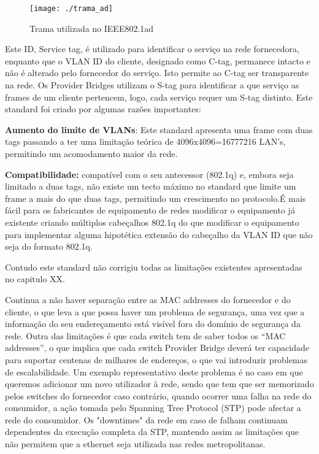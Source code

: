 \documentclass[a4paper]{IEEEtran}
\begin{document}
\begin{figure}[htp]
	\centering
	\texttt{[image: ./trama\_ad]}
	\caption{Trama utilizada no IEEE802.1ad}
	\label{fig:trama_ad}
\end{figure}

Este ID, Service tag, é utilizado para identificar o serviço na rede fornecedora, enquanto que o VLAN ID do cliente, designado como C-tag, permanece intacto e não é alterado pelo fornecedor do serviço. 
Isto permite ao C-tag ser transparente na rede. Os Provider Bridges utilizam o S-tag para identificar a que serviço as frames de um cliente pertencem, logo, cada serviço requer um S-tag distinto. Este standard foi criado por algumas razões importantes:

\textbf{Aumento do limite de VLANs}: Este standard apresenta uma frame com duas tags passando a ter uma limitação teórica de 4096x4096=16777216 LAN’s, permitindo um acomodamento maior da rede. 

\textbf{Compatibilidade:} compatível com o seu antecessor (802.1q) e, embora seja limitado a duas tags, não existe um tecto máximo no standard que limite um frame a mais do que duas tags, permitindo um crescimento no protocolo.É mais fácil para os fabricantes de equipamento de redes modificar o equipamento já existente criando múltiplos cabeçalhos 802.1q do que modificar o equipamento para implementar alguma hipotética extensão do cabeçalho da VLAN ID que não seja do formato 802.1q.

Contudo este standard não corrigiu todas as limitações existentes apresentadas no capitulo XX.

Continua a não haver separação entre as MAC addresses do fornecedor e do cliente, o que leva a que possa haver um problema de segurança, uma vez que a informação do seu endereçamento está visível fora do domínio de segurança da rede. 
Outra das limitações é que cada switch tem de saber todos os “MAC addresses”, o que implica que cada switch Provider Bridge deverá ter capacidade para suportar centenas de milhares de endereços, o que vai introduzir problemas de escalabilidade. Um exemplo representativo deste problema é no caso em que queremos adicionar um novo utilizador à rede, sendo que tem que ser memorizado pelos switches do fornecedor caso contrário, quando ocorrer uma falha na rede do consumidor, a ação tomada pelo Spanning Tree Protocol (STP) pode afectar a rede do consumidor. Os "downtimes" da rede em caso de falham continuam dependentes da execução completa da STP, mantendo assim as limitações que não permitem que a ethernet seja utilizada nas redes metropolitanas.
\end{document}
